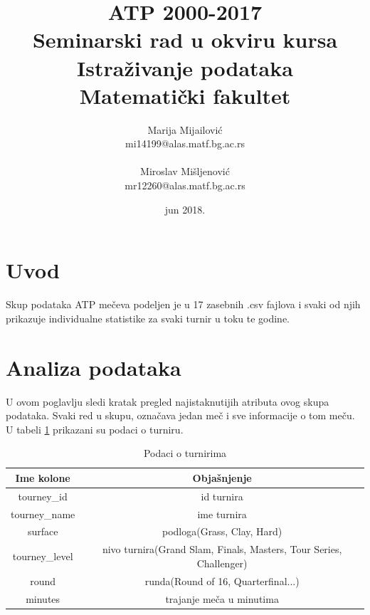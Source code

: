 \documentclass[a4paper]{article}
\begin{document}
\title{ATP 2000-2017\\ \small{Seminarski rad u okviru kursa\\Istraživanje podataka\\ Matematički fakultet\\} \vspace{1cm}}
\author{Marija Mijailović\\mi14199@alas.matf.bg.ac.rs\\ \\Miroslav Mišljenović\\mr12260@alas.matf.bg.ac.rs}
\date{jun 2018.}
\maketitle


\tableofcontents

\newpage

\section{Uvod}
\label{sec:uvod}

Skup podataka ATP mečeva podeljen je u 17 zasebnih .csv fajlova i svaki od njih prikazuje individualne statistike za svaki turnir u toku te godine.

\section{Analiza podataka}

U ovom poglavlju sledi kratak pregled najistaknutijih atributa ovog skupa podataka.
Svaki red u skupu, označava jedan meč i sve informacije o tom meču.
U tabeli \ref{table:turnir} prikazani su podaci o turniru.
\begin{table}[h]
	\begin{center}
		\begin{tabular}{ | c | c | } 
			\hline
			Ime kolone & Objašnjenje \\ 
			\hline
			tourney\_id & id turnira \\
			tourney\_name & ime turnira \\
			surface & podloga(Grass, Clay, Hard) \\
			tourney\_level & nivo turnira(Grand Slam, Finals, Masters, Tour Series, Challenger) \\ 
			round & runda(Round of 16, Quarterfinal...) \\
			minutes & trajanje meča u minutima \\
			\hline
		\end{tabular}
	\end{center}
	\caption{Podaci o turnirima}
	\label{table:turnir}
\end{table}
\end{document}
